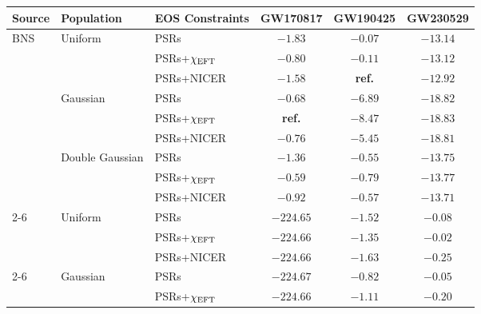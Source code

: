 \begin{tabular}{|l|l|l|c|c|c|}
\hline
\textbf{Source} & \textbf{Population} & \textbf{EOS Constraints} & \textbf{GW170817} & \textbf{GW190425} & \textbf{GW230529} \\
\hline\hline
\multirow{9}{*}{BNS} & \multirow{3}{*}{Uniform} & PSRs & \cellcolor{jeffreysred4}$-1.83$ & \cellcolor{jeffreysred1}$-0.07$ & \cellcolor{jeffreysred5}$-13.14$ \\
 &  & PSRs+$\chi_{\rm{EFT}}$ & \cellcolor{jeffreysred2}$-0.80$ & \cellcolor{jeffreysred1}$-0.11$ & \cellcolor{jeffreysred5}$-13.12$ \\
 &  & PSRs+NICER & \cellcolor{jeffreysred4}$-1.58$ & \textbf{ref.} & \cellcolor{jeffreysred5}$-12.92$ \\
\cline{2-6}
 & \multirow{3}{*}{Gaussian} & PSRs & \cellcolor{jeffreysred2}$-0.68$ & \cellcolor{jeffreysred5}$-6.89$ & \cellcolor{jeffreysred5}$-18.82$ \\
 &  & PSRs+$\chi_{\rm{EFT}}$ & \textbf{ref.} & \cellcolor{jeffreysred5}$-8.47$ & \cellcolor{jeffreysred5}$-18.83$ \\
 &  & PSRs+NICER & \cellcolor{jeffreysred2}$-0.76$ & \cellcolor{jeffreysred5}$-5.45$ & \cellcolor{jeffreysred5}$-18.81$ \\
\cline{2-6}
 & \multirow{3}{*}{Double Gaussian} & PSRs & \cellcolor{jeffreysred3}$-1.36$ & \cellcolor{jeffreysred2}$-0.55$ & \cellcolor{jeffreysred5}$-13.75$ \\
 &  & PSRs+$\chi_{\rm{EFT}}$ & \cellcolor{jeffreysred2}$-0.59$ & \cellcolor{jeffreysred2}$-0.79$ & \cellcolor{jeffreysred5}$-13.77$ \\
 &  & PSRs+NICER & \cellcolor{jeffreysred2}$-0.92$ & \cellcolor{jeffreysred2}$-0.57$ & \cellcolor{jeffreysred5}$-13.71$ \\
\cline{2-6}
\hline\hline
\multirow{9}{*}{NSBH} & \multirow{3}{*}{Uniform} & PSRs & \cellcolor{jeffreysred5}$-224.65$ & \cellcolor{jeffreysred4}$-1.52$ & \cellcolor{jeffreysred1}$-0.08$ \\
 &  & PSRs+$\chi_{\rm{EFT}}$ & \cellcolor{jeffreysred5}$-224.66$ & \cellcolor{jeffreysred3}$-1.35$ & \cellcolor{jeffreysred1}$-0.02$ \\
 &  & PSRs+NICER & \cellcolor{jeffreysred5}$-224.66$ & \cellcolor{jeffreysred4}$-1.63$ & \cellcolor{jeffreysred1}$-0.25$ \\
\cline{2-6}
 & \multirow{3}{*}{Gaussian} & PSRs & \cellcolor{jeffreysred5}$-224.67$ & \cellcolor{jeffreysred2}$-0.82$ & \cellcolor{jeffreysred1}$-0.05$ \\
 &  & PSRs+$\chi_{\rm{EFT}}$ & \cellcolor{jeffreysred5}$-224.66$ & \cellcolor{jeffreysred3}$-1.11$ & \cellcolor{jeffreysred1}$-0.20$ \\

\end{tabular}
